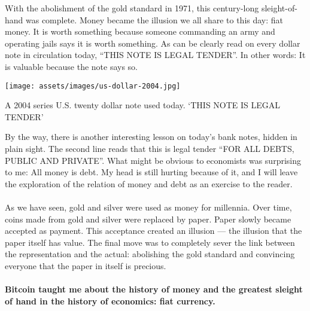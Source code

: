 With the abolishment of the gold standard in 1971, this century-long
sleight-of-hand was complete. Money became the illusion we all share to
this day: fiat money. It is worth something because someone commanding
an army and operating jails says it is worth something. As can be
clearly read on every dollar note in circulation today, \enquote{THIS NOTE IS
LEGAL TENDER}. In other words: It is valuable because the note says so.

\begin{center}
  \centering
  \texttt{[image: assets/images/us-dollar-2004.jpg]}
  \caption{A 2004 series U.S. twenty dollar note used today. `THIS NOTE IS LEGAL TENDER'}
  \label{fig:us-dollar-2004}
\end{center}

By the way, there is another interesting lesson on today's bank notes,
hidden in plain sight. The second line reads that this is legal tender
\enquote{FOR ALL DEBTS, PUBLIC AND PRIVATE}. What might be obvious to economists
was surprising to me: All money is debt. My head is still hurting
because of it, and I will leave the exploration of the relation of money
and debt as an exercise to the reader.

\paragraph{}
As we have seen, gold and silver were used as money for millennia. Over
time, coins made from gold and silver were replaced by paper. Paper
slowly became accepted as payment. This acceptance created an
illusion --- the illusion that the paper itself has value. The final
move was to completely sever the link between the representation and the
actual: abolishing the gold standard and convincing everyone that the
paper in itself is precious.

\paragraph{Bitcoin taught me about the history of money and the greatest sleight of
hand in the history of economics: fiat currency.}

%
%
%
%
